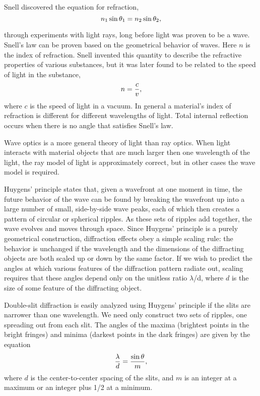 Snell discovered the equation for refraction,
\begin{equation*}
n_1 \sin \theta_1=n_2 \sin \theta_2,
\end{equation*}
\begin{longnoteafterequation}
\end{longnoteafterequation}
\noindent through experiments with light rays, long before light was
proven to be a wave. Snell's law can be proven based on the
geometrical behavior of waves. Here $n$ is the index of
refraction. Snell invented this quantity to describe the
refractive properties of various substances, but it was
later found to be related to the speed of light in the substance,
\begin{equation*}
                n  =  \frac{c}{v},
\end{equation*}
where $c$ is the speed of light in a vacuum. In general a
material's index of refraction is different for different
wavelengths of light.
Total internal reflection occurs when there is no
angle that satisfies Snell's law.

Wave optics is a more general theory of light than ray
optics. When light interacts with material objects that are
much larger then one wavelength of the light, the ray model
of light is approximately correct, but in other cases the
wave model is required.

Huygens' principle states that, given a wavefront at one
moment in time, the future behavior of the wave can be found
by breaking the wavefront up into a large number of small,
side-by-side wave peaks, each of which then creates a
pattern of circular or spherical ripples. As these sets of
ripples add together, the wave evolves and moves through
space. Since Huygens' principle is a purely geometrical
construction, diffraction effects obey a simple scaling
rule: the behavior is unchanged if the wavelength and the
dimensions of the diffracting objects are both scaled up or
down by the same factor. If we wish to predict the angles at
which various features of the diffraction pattern radiate
out, scaling requires that these angles depend only on the
unitless ratio $\lambda $/d, where $d$ is the size of some
feature of the diffracting object.

Double-slit diffraction is easily analyzed using Huygens'
principle if the slits are narrower than one wavelength. We
need only construct two sets of ripples, one spreading out
from each slit. The angles of the maxima (brightest points
in the bright fringes) and minima (darkest points in the
dark fringes) are given by the equation
\begin{equation*}
        \frac{\lambda}{d} = \frac{\sin\theta}{m},
\end{equation*}
where $d$ is the center-to-center spacing of the slits, and
$m$ is an integer at a maximum or an integer plus 1/2 at a minimum.


